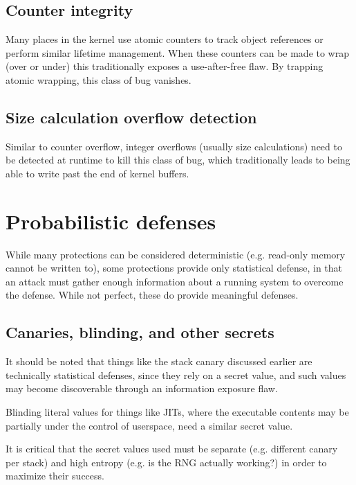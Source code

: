\documentclass[a4paper,8pt,english]{sphinxmanual}
\begin{document}
\subsection{Counter integrity}
\label{security/self-protection:counter-integrity}
Many places in the kernel use atomic counters to track object references
or perform similar lifetime management. When these counters can be made
to wrap (over or under) this traditionally exposes a use-after-free
flaw. By trapping atomic wrapping, this class of bug vanishes.


\subsection{Size calculation overflow detection}
\label{security/self-protection:size-calculation-overflow-detection}
Similar to counter overflow, integer overflows (usually size calculations)
need to be detected at runtime to kill this class of bug, which
traditionally leads to being able to write past the end of kernel buffers.


\section{Probabilistic defenses}
\label{security/self-protection:probabilistic-defenses}
While many protections can be considered deterministic (e.g. read-only
memory cannot be written to), some protections provide only statistical
defense, in that an attack must gather enough information about a
running system to overcome the defense. While not perfect, these do
provide meaningful defenses.


\subsection{Canaries, blinding, and other secrets}
\label{security/self-protection:canaries-blinding-and-other-secrets}
It should be noted that things like the stack canary discussed earlier
are technically statistical defenses, since they rely on a secret value,
and such values may become discoverable through an information exposure
flaw.

Blinding literal values for things like JITs, where the executable
contents may be partially under the control of userspace, need a similar
secret value.

It is critical that the secret values used must be separate (e.g.
different canary per stack) and high entropy (e.g. is the RNG actually
working?) in order to maximize their success.
\end{document}

